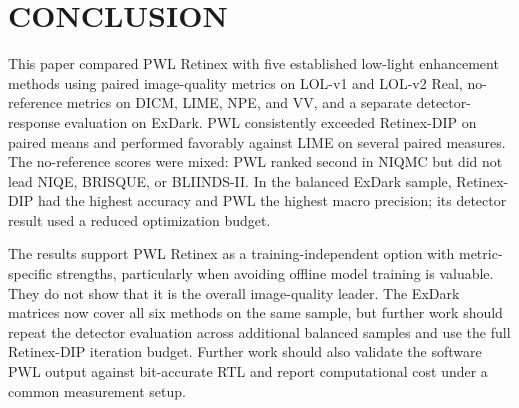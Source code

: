 \documentclass[conference]{IEEEtran}
\begin{document}
\section{CONCLUSION}

This paper compared PWL Retinex with five established low-light enhancement methods using paired image-quality metrics on LOL-v1 and LOL-v2 Real, no-reference metrics on DICM, LIME, NPE, and VV, and a separate detector-response evaluation on ExDark. PWL consistently exceeded Retinex-DIP on paired means and performed favorably against LIME on several paired measures. The no-reference scores were mixed: PWL ranked second in NIQMC but did not lead NIQE, BRISQUE, or BLIINDS-II. In the balanced ExDark sample, Retinex-DIP had the highest accuracy and PWL the highest macro precision; its detector result used a reduced optimization budget.

The results support PWL Retinex as a training-independent option with metric-specific strengths, particularly when avoiding offline model training is valuable. They do not show that it is the overall image-quality leader. The ExDark matrices now cover all six methods on the same sample, but further work should repeat the detector evaluation across additional balanced samples and use the full Retinex-DIP iteration budget. Further work should also validate the software PWL output against bit-accurate RTL and report computational cost under a common measurement setup.
\end{document}
